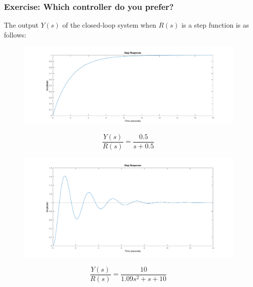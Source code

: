 \begin{frame}
	\frametitle{Exercise: Which controller do you prefer?}
	The output $Y(s)$ of the closed-loop system when $R(s)$ is a step function is as follows:
	\hspace*{-1em}
	\begin{minipage}{0.7\linewidth}
	\begin{figure}
		\centering
		\includegraphics[width=\columnwidth]{smooth-step}
		\label{fig:smooth-step}
	\end{figure}
\end{minipage}
\begin{minipage}{0.2\linewidth}
		\[\frac{Y(s)}{R(s)} = \frac{0.5}{s+0.5}\]
\end{minipage}
\hspace*{-1em}
	\begin{minipage}{0.7\linewidth}
			\begin{figure}
				\centering
				\includegraphics[width=\columnwidth]{osc-step}
				\label{fig:osc-step}
			\end{figure}
	\end{minipage}
	\begin{minipage}{0.2\linewidth}
			\[\frac{Y(s)}{R(s)} = \frac{10}{1.09s^2 + s + 10}\]
		\end{minipage}
\end{frame}

